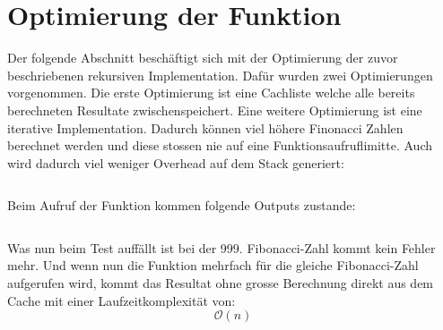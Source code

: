 \section{Optimierung der Funktion}
Der folgende Abschnitt beschäftigt sich mit der 
Optimierung der zuvor beschriebenen rekursiven
Implementation. Dafür wurden zwei Optimierungen vorgenommen.
Die erste Optimierung ist eine Cachliste welche alle bereits
berechneten Resultate zwischenspeichert. Eine weitere
Optimierung ist eine iterative Implementation.
Dadurch können viel höhere Finonacci Zahlen berechnet werden
und diese stossen nie auf eine Funktionsaufruflimitte.
Auch wird dadurch viel weniger Overhead auf dem Stack generiert:
\begin{mdframed}[backgroundcolor=bg]
    \inputminted{Python}{src/advanced_fibonacci.py}
\end{mdframed}

\newpage

Beim Aufruf der Funktion kommen folgende Outputs zustande:
\begin{mdframed}[backgroundcolor=bg]
    \inputminted{Python}{src/advanced_fibonacci_test.py}
\end{mdframed}
Was nun beim Test auffällt ist bei der 999. Fibonacci-Zahl
kommt kein Fehler mehr. Und wenn nun die Funktion mehrfach
für die gleiche Fibonacci-Zahl aufgerufen wird,
kommt das Resultat ohne grosse Berechnung direkt aus dem
Cache mit einer Laufzeitkomplexität von:
\begin{equation}
    \mathcal{O}(n)
\end{equation}